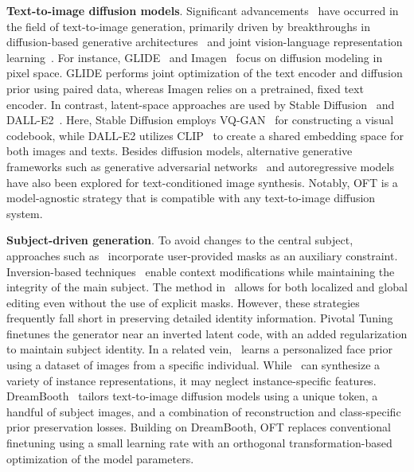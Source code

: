 \textbf{Text-to-image diffusion models}. Significant advancements~\cite{saharia2022photorealistic,ramesh2022hierarchical,rombach2022high,gu2022vector,nichol2022glide} have occurred in the field of text-to-image generation, primarily driven by breakthroughs in diffusion-based generative architectures~\cite{ho2020denoising,song2021score,song2021denoising,dhariwal2021diffusion} and joint vision-language representation learning~\cite{su2020vlbert,lu2019vilbert,radford2021learning,wang2021simvlm,li2022blip,li2023blip,alayrac2022flamingo,schuhmann2022laion}. For instance, GLIDE~\cite{nichol2022glide} and Imagen~\cite{saharia2022photorealistic} focus on diffusion modeling in pixel space. GLIDE performs joint optimization of the text encoder and diffusion prior using paired data, whereas Imagen relies on a pretrained, fixed text encoder. In contrast, latent-space approaches are used by Stable Diffusion~\cite{rombach2022high} and DALL-E2~\cite{ramesh2022hierarchical}. Here, Stable Diffusion employs VQ-GAN~\cite{esser2021taming} for constructing a visual codebook, while DALL-E2 utilizes CLIP~\cite{radford2021learning} to create a shared embedding space for both images and texts. Besides diffusion models, alternative generative frameworks such as generative adversarial networks~\cite{reed2016generative,zhang2017stackgan,xu2018attngan,li2019controllable} and autoregressive models~\cite{ramesh2021zero,ding2021cogview,wu2022nuwa,yuscaling} have also been explored for text-conditioned image synthesis. Notably, OFT is a model-agnostic strategy that is compatible with any text-to-image diffusion system.

\textbf{Subject-driven generation}. To avoid changes to the central subject, approaches such as~\cite{avrahami2022blended,nichol2022glide} incorporate user-provided masks as an auxiliary constraint. Inversion-based techniques~\cite{choi2021ilvr,dhariwal2021diffusion,ramesh2022hierarchical,gal2022image} enable context modifications while maintaining the integrity of the main subject. The method in~\cite{hertz2022prompt} allows for both localized and global editing even without the use of explicit masks. However, these strategies frequently fall short in preserving detailed identity information. Pivotal Tuning~\cite{roich2022pivotal} finetunes the generator near an inverted latent code, with an added regularization to maintain subject identity. In a related vein,~\cite{nitzan2022mystyle} learns a personalized face prior using a dataset of images from a specific individual. While~\cite{casanova2021instance} can synthesize a variety of instance representations, it may neglect instance-specific features. DreamBooth~\cite{ruiz2023dreambooth} tailors text-to-image diffusion models using a unique token, a handful of subject images, and a combination of reconstruction and class-specific prior preservation losses. Building on DreamBooth, OFT replaces conventional finetuning using a small learning rate with an orthogonal transformation-based optimization of the model parameters.

